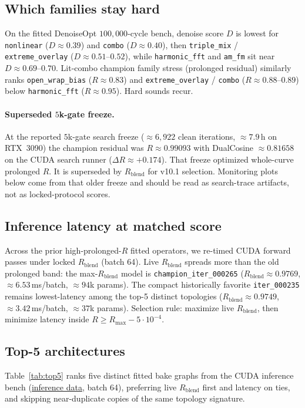 \subsection{Which families stay hard}
\label{sec:family-hardness}
On the fitted DenoiseOpt $100{,}000$-cycle bench, denoise score $D$ is lowest for \texttt{nonlinear} ($D\approx 0.39$) and \texttt{combo} ($D\approx 0.40$), then \texttt{triple\_mix} / \texttt{extreme\_overlay} ($D\approx 0.51$--$0.52$), while \texttt{harmonic\_fft} and \texttt{am\_fm} sit near $D\approx 0.69$--$0.70$.
Lit-combo champion family stress (prolonged residual) similarly ranks \texttt{open\_wrap\_bias} ($R\approx 0.83$) and \texttt{extreme\_overlay} / \texttt{combo} ($R\approx 0.88$--$0.89$) below \texttt{harmonic\_fft} ($R\approx 0.95$).
Hard sounds recur.

\paragraph{Superseded $5$k-gate freeze.}
At the reported $5$k-gate search freeze ($\approx 6{,}922$ clean iterations, $\approx 7.9$\,h on RTX~3090) the champion residual was $R\approx 0.99093$ with DualCosine $\approx 0.81658$ on the CUDA search runner ($\Delta R\approx{+}0.174$).
That freeze optimized whole-curve prolonged $R$.
It is superseded by $R_{\mathrm{blend}}$ for v10.1 selection.
Monitoring plots below come from that older freeze and should be read as search-trace artifacts, not as locked-protocol scores.

\subsection{Inference latency at matched score}
\label{sec:inference-latency}
Across the prior high-prolonged-$R$ fitted operators, we re-timed CUDA forward passes under locked $R_{\mathrm{blend}}$ (batch 64).
Live $R_{\mathrm{blend}}$ spreads more than the old prolonged band: the max-$R_{\mathrm{blend}}$ model is
\texttt{champion\_iter\_000265} ($R_{\mathrm{blend}}{\approx}0.9769$, $\approx 6.53$\,ms/batch, $\approx 94$k params).
The compact historically favorite \texttt{iter\_000235} remains lowest-latency among the top-5 distinct topologies
($R_{\mathrm{blend}}{\approx}0.9749$, $\approx 3.42$\,ms/batch, $\approx 37$k params).
Selection rule: maximize live $R_{\mathrm{blend}}$, then minimize latency inside $R\ge R_{\max}-5\cdot10^{-4}$.

\subsection{Top-5 architectures}
\label{sec:top5-arch}
Table~\ref{tab:top5} ranks five distinct fitted bake graphs from the CUDA inference bench
(\href{https://github.com/reeldemo/denoise-opt-meta/blob/master/paper/Unsupervised_Wrap-Discontinuity_Repair_in_Wavetable_Synthesis_via_Hybrid_GA-PPO_Meta-Search_v12/figures/inference_bench.json}{inference data}, batch 64), preferring live $R_{\mathrm{blend}}$ first and latency on ties,
and skipping near-duplicate copies of the same topology signature.

